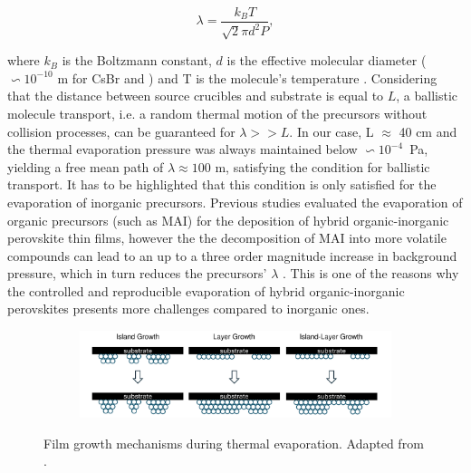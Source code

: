 \begin{equation}
    \lambda = \frac{k_BT}{\sqrt{2}\pi d^2P},
\end{equation}

 where $k_B$ is the Boltzmann constant, $d$ is the effective molecular diameter ($\backsim 10^{-10}$ m for CsBr and ) and T is the molecule's temperature \cite{Dong2023GrowthFilm}. Considering that the distance between source crucibles and substrate is equal to $L$, a ballistic molecule transport, i.e.  a random thermal motion of the precursors without collision processes, can be guaranteed for $\lambda >> L$. In our case, L $\approx$ 40 cm and the thermal evaporation pressure was always maintained below $\backsim 10^{-4}$~Pa, yielding a free mean path of $\lambda \approx 100$ m, satisfying the condition for ballistic transport. It has to be highlighted that this condition is only satisfied for the evaporation of inorganic precursors. Previous studies evaluated the evaporation of organic precursors (such as MAI) for the deposition of hybrid organic-inorganic perovskite thin films, however the the decomposition of MAI into more volatile compounds can lead to an up to a three order magnitude increase in background pressure, which in turn reduces the precursors' $\lambda$ \cite{Abzieher2021FromCells}. This is one of the reasons why the controlled and reproducible evaporation of hybrid organic-inorganic perovskites presents more challenges compared to inorganic ones. 

 \begin{figure}[htbp]
    \centering
    \begin{subfigure}[t]{0.99\textwidth} %
        \centering
        \includegraphics[width=\textwidth]{chapters/material_properties/images/film-growth.pdf} %
    \end{subfigure}

    \caption[Film growth mechanisms during thermal evaporation.]{Film growth mechanisms during thermal evaporation. Adapted from \cite{Du2022ThermalOutlook}.}
    \label{fig:ch2:film_growth}
\end{figure}

